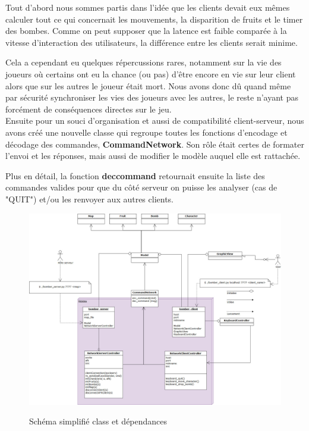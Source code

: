 \documentclass[a4paper]{article}
\begin{document}
\newpage

Tout d'abord nous sommes partis dans l'idée que les clients devait eux mêmes calculer tout ce qui concernait les mouvements, la disparition de fruits et le timer des bombes. Comme on peut supposer que la latence est faible comparée à la vitesse d'interaction des utilisateurs, la différence entre les clients serait minime.

Cela a cependant eu quelques répercussions rares, notamment sur la vie des joueurs où certains ont eu la chance (ou pas) d'être encore en vie sur leur client alors que sur les autres le joueur était mort. Nous avons donc dû quand même par sécurité synchroniser les vies des joueurs avec les autres, le reste n'ayant pas forcément de conséquences directes sur le jeu.
\\

Ensuite pour un souci d'organisation et aussi de compatibilité client-serveur, nous avons créé une nouvelle classe qui regroupe toutes les fonctions d'encodage et décodage des commandes, \textbf{CommandNetwork}. Son rôle était certes de formater l'envoi et les réponses, mais aussi de modifier le modèle auquel elle est rattachée.

Plus en détail, la fonction \textbf{dec\textunderscore command} retournait ensuite la liste des commandes valides pour que du côté serveur on puisse les analyser (cas de "QUIT") et/ou les renvoyer aux autres clients.


\begin{figure}[!htbp]
	\centering
	\includegraphics[width=\textwidth]{IMG_Latex/Classes.jpg}\\
	\caption{Schéma simplifié class et dépendances}
	\label{shema/globalproject}
\end{figure}
\end{document}
